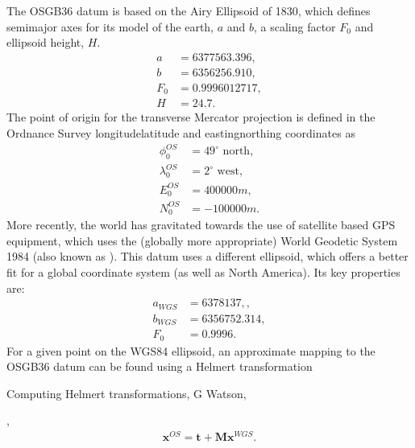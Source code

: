 \documentclass[letterpaper,10pt,english]{sphinxmanual}
\begin{document}
\sphinxAtStartPar
The OSGB36 datum is based on the Airy Ellipsoid of 1830, which defines
semimajor axes for its model of the earth, \(a\) and \(b\), a scaling
factor \(F_0\) and ellipsoid height, \(H\).
\begin{equation*}
\begin{split}a &= 6377563.396, \\
b &= 6356256.910, \\
F_0 &= 0.9996012717, \\
H &= 24.7.\end{split}
\end{equation*}
\sphinxAtStartPar
The point of origin for the transverse Mercator projection is defined in the
Ordnance Survey longitude\sphinxhyphen{}latitude and easting\sphinxhyphen{}northing coordinates as
\begin{equation*}
\begin{split}\phi^{OS}_0 &= 49^\circ \mbox{ north}, \\
\lambda^{OS}_0 &= 2^\circ \mbox{ west}, \\
E^{OS}_0 &= 400000 m, \\
N^{OS}_0 &= -100000 m.\end{split}
\end{equation*}
\sphinxAtStartPar
More recently, the world has gravitated towards the use of satellite based GPS
equipment, which uses the (globally more appropriate) World Geodetic System
1984 (also known as ). This datum uses a different ellipsoid, which offers a
better fit for a global coordinate system (as well as North America). Its key
properties are:
\begin{equation*}
\begin{split}a_{WGS} &= 6378137,, \\
b_{WGS} &= 6356752.314, \\
F_0 &= 0.9996.\end{split}
\end{equation*}
\sphinxAtStartPar
For a given point on the WGS84 ellipsoid, an approximate mapping to the
OSGB36 datum can be found using a Helmert transformation %
\begin{footnote}[3]\sphinxAtStartFootnote
Computing Helmert transformations, G Watson, 
%
\end{footnote},
\begin{equation*}
\begin{split}\mathbf{x}^{OS} = \mathbf{t}+\mathbf{M}\mathbf{x}^{WGS}.\end{split}
\end{equation*}
\end{document}
